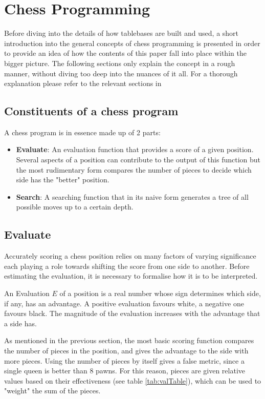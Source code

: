 \section{Chess Programming}
\label{sec:Chess Programming}

Before diving into the details of how tablebases are built and used, a short introduction into the general concepts of chess programming is presented in order to provide an idea of how the contents of this paper fall into place within the bigger picture. The following sections only explain the concept in a rough manner, without diving too deep into the nuances of it all. For a thorough explanation please refer to the relevant sections in \cite{Klein} \cite{Shan50}

\subsection{Constituents of a chess program}
A chess program is in essence made up of 2 parts:

\begin{itemize}
    \item \textbf{Evaluate}: An evaluation function that provides a score of a given position. Several aspects of a position can contribute to the output of this function but the most rudimentary form compares the number of pieces to decide which side has the "better" position.
    \item \textbf{Search}: A searching function that in its naive form generates a tree of all possible moves up to a certain depth.
\end{itemize}

\subsection{Evaluate}
Accurately scoring a chess position relies on many factors of varying significance each playing a role towards shifting the score from one side to another. Before estimating the evaluation, it is necessary to formalise how it is to be interpreted. 

An Evaluation \(E\) of a position is a real number whose sign determines which side, if any, has an advantage. A positive evaluation favours white, a negative one favours black. The magnitude of the evaluation increases with the advantage that a side has.

As mentioned in the previous section, the most basic scoring function compares the number of pieces in the position, and gives the advantage to the side with more pieces. Using the number of pieces by itself gives a false metric, since a single queen is better than 8 pawns. For this reason, pieces are given relative values based on their effectiveness (see table \ref{tab:valTable}), which can be used to "weight" the sum of the pieces.

